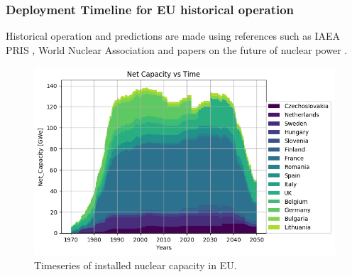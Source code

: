 \begin{frame}
	\frametitle{Deployment Timeline for EU historical operation}
	Historical operation and predictions are made using references such as \gls{IAEA} \gls{PRIS} \cite{iaea_pris_2017},
	World Nuclear Association \cite{world_nuclear_association_nuclear_2017} and papers on the 
	future of nuclear power
	\cite{joskow_future_2012, hatch_politics_2015}.
	\begin{figure}[htbp!]
		\begin{center}
			\includegraphics[width=.8\linewidth,height=.8\textheight,keepaspectratio]{./images/eu_future/power_plot.png}
		\end{center}
		\caption{Timeseries of installed nuclear capacity in \gls{EU}.}
		\label{fig:eu_pow}
	\end{figure}
	
\end{frame}

